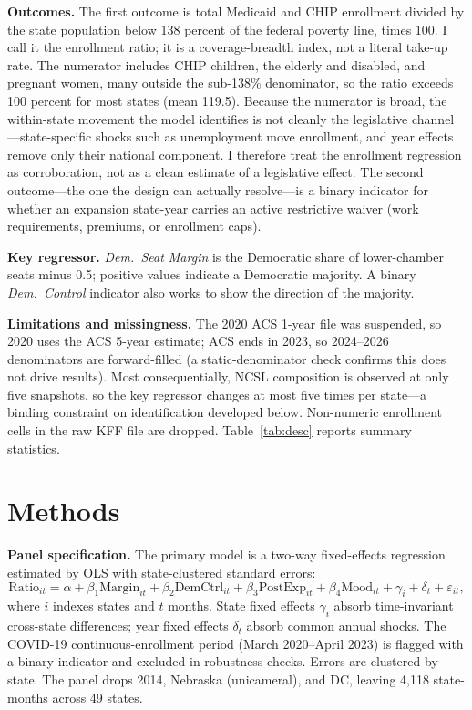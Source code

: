 \documentclass[9pt,twoside]{pnas-new}
\begin{document}
\textbf{Outcomes.} The first outcome is total Medicaid and CHIP enrollment divided by the state population below 138 percent of the federal poverty line, times 100. I call it the enrollment ratio; it is a coverage-breadth index, not a literal take-up rate. The numerator includes CHIP children, the elderly and disabled, and pregnant women, many outside the sub-138\% denominator, so the ratio exceeds 100 percent for most states (mean 119.5). Because the numerator is broad, the within-state movement the model identifies is not cleanly the legislative channel---state-specific shocks such as unemployment move enrollment, and year effects remove only their national component. I therefore treat the enrollment regression as corroboration, not as a clean estimate of a legislative effect. The second outcome---the one the design can actually resolve---is a binary indicator for whether an expansion state-year carries an active restrictive waiver (work requirements, premiums, or enrollment caps).

\textbf{Key regressor.} \emph{Dem.\ Seat Margin} is the Democratic share of lower-chamber seats minus 0.5; positive values indicate a Democratic majority. A binary \emph{Dem.\ Control} indicator also works to show the direction of the majority.

\textbf{Limitations and missingness.} The 2020 ACS 1-year file was suspended, so 2020 uses the ACS 5-year estimate; ACS ends in 2023, so 2024--2026 denominators are forward-filled (a static-denominator check confirms this does not drive results). Most consequentially, NCSL composition is observed at only five snapshots, so the key regressor changes at most five times per state---a binding constraint on identification developed below. Non-numeric enrollment cells in the raw KFF file are dropped. Table~\ref{tab:desc} reports summary statistics.

\section*{Methods}

\textbf{Panel specification.} The primary model is a two-way fixed-effects regression estimated by OLS with state-clustered standard errors:
\[
\mathrm{Ratio}_{it}=\alpha+\beta_1\mathrm{Margin}_{it}+\beta_2\mathrm{DemCtrl}_{it}+\beta_3\mathrm{PostExp}_{it}+\beta_4\mathrm{Mood}_{it}+\gamma_i+\delta_t+\varepsilon_{it},
\]
where $i$ indexes states and $t$ months. State fixed effects $\gamma_i$ absorb time-invariant cross-state differences; year fixed effects $\delta_t$ absorb common annual shocks. The COVID-19 continuous-enrollment period (March 2020--April 2023) is flagged with a binary indicator and excluded in robustness checks. Errors are clustered by state. The panel drops 2014, Nebraska (unicameral), and DC, leaving 4{,}118 state-months across 49 states.
\end{document}
